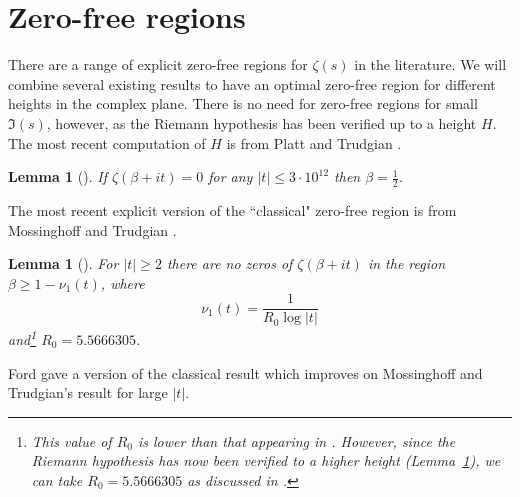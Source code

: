 \documentclass[reqno]{amsart}
\newtheorem{lemma}[theorem]{Lemma}
\numberwithin{equation}{section}
\theoremstyle{remark}
\begin{document}
\section{Zero-free regions}\label{zfsect}
There are a range of explicit zero-free regions for $\zeta(s)$ in the literature. We will combine several existing results to have an optimal zero-free region for different heights in the complex plane. There is no need for zero-free regions for small $\Im(s)$, however, as the Riemann hypothesis has been verified up to a height $H$. The most recent computation of $H$ is from Platt and Trudgian \cite{P_T-RH_21}.
\begin{lemma}[{\cite{P_T-RH_21}}]\label{rheightlem}
    If $\zeta(\beta+i t)=0$ for any $|t|\leq 3\cdot 10^{12}$ then $\beta=\frac{1}{2}$.
\end{lemma}

The most recent explicit version of the ``classical" zero-free region is from Mossinghoff and Trudgian \cite{M_T_2015}.

\begin{lemma}[{\cite{M_T_2015}}]\label{classlem}
    For $|t|\geq 2$ there are no zeros of $\zeta(\beta+it)$ in the region $\beta\geq 1-\nu_1(t)$, where
    \begin{equation*}
        \nu_1(t)=\frac{1}{R_0\log |t|}
    \end{equation*}
    and\footnote{This value of $R_0$ is lower than that appearing in \cite[Theorem 1]{M_T_2015}. However, since the Riemann hypothesis has now been verified to a higher height (Lemma~\ref{rheightlem}), we can take $R_0=5.5666305$ as discussed in \cite[Section 6.1]{M_T_2015}.} $R_0=5.5666305$.
\end{lemma}

Ford \cite{Ford_2002} gave a version of the classical result which improves on Mossinghoff and Trudgian's result for large $|t|$.
\end{document}
